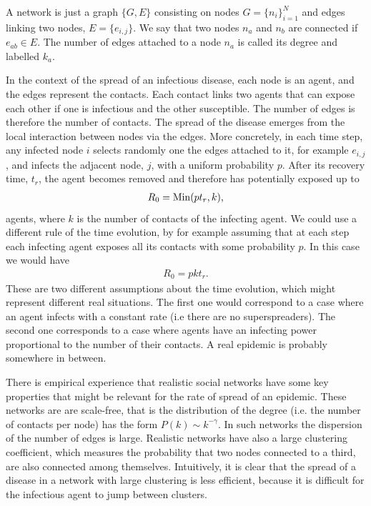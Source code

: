 \documentclass[a4paper,oneside,11pt]{article}
\begin{document}
A network is just a graph \(\{G,E\}\)
consisting on
nodes \(G=\{n_i\}_{i=1}^N\) and edges linking two nodes, \(E=\{e_{i,j}\}\). We say that
two nodes \(n_a\) and \(n_b\) are connected if \(e_{ab}\in E\). The number
of edges attached to a node \(n_a\) is called its degree and labelled
\(k_a\).

In the context of the spread of an infectious disease, each node is
an agent, and the edges represent the contacts. Each contact links two agents that can expose each other if one is infectious and the other susceptible. The number of edges is therefore the number of contacts. The spread of the disease emerges from the local interaction between nodes via the edges. More concretely, in each time step, any infected node $i$ selects randomly one the edges attached to it, for example $e_{i,j}$, and infects the adjacent node, $j$, with a uniform probability $p$.
After its recovery time, $t_r$, the agent becomes removed and therefore has potentially exposed up to  
\begin{eqnarray}
R_0 = {\rm Min}(p t_r, k),
\end{eqnarray}
agents, where $k$ is the number of contacts of the infecting agent. 
 We could use a different rule of the time evolution, by for example assuming that at each step each infecting agent exposes all its contacts with some probability $p$. In this case we would have
 \begin{eqnarray}
 R_0= p k t_r. 
 \end{eqnarray}
These are two different assumptions about the time evolution, which might represent different real situations. The first one would correspond to a case where an agent infects with a constant rate (i.e there are no superspreaders). The second one corresponds to a case where agents have an infecting power proportional to the number of their contacts. A real epidemic is probably somewhere in between.

 There is empirical experience that realistic social networks have some key properties that might be relevant for the rate of spread of an epidemic.  These networks are are scale-free, that is the distribution of the degree (i.e. the number of contacts per node) has the form \(P(k)\sim k^{-\gamma}\). In such networks the dispersion of the number of edges is large. Realistic networks have also a large clustering coefficient, which measures the probability that two nodes connected to a third, are also connected among themselves. Intuitively, it is clear that the spread of a disease in a network with large clustering is less efficient, because it is difficult for the infectious agent to jump between clusters.
\end{document}
